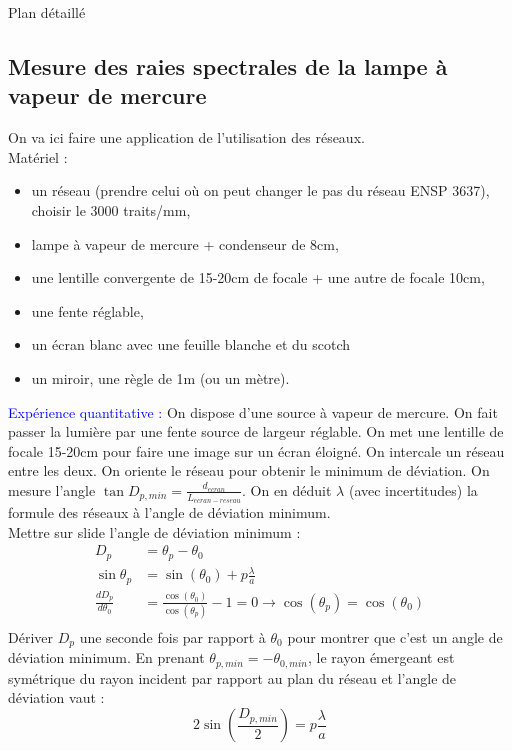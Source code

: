 \begin{reportBlock}{Plan détaillé}
  \subsection{Mesure des raies spectrales de la lampe à vapeur de mercure}
  On va ici faire une application de l'utilisation des réseaux.\\
  Matériel :
  \begin{itemize}
      \item un réseau (prendre celui où on peut changer le pas du réseau ENSP 3637), choisir le 3000 traits/mm,
      \item lampe à vapeur de mercure + condenseur de 8cm,
      \item une lentille convergente de 15-20cm de focale + une autre de focale 10cm,
      \item une fente réglable,
      \item un écran blanc avec une feuille blanche et du scotch
      \item un miroir, une règle de 1m (ou un mètre).
  \end{itemize}
  \textcolor{blue}{Expérience quantitative :} On dispose d'une source à vapeur de mercure. On fait passer la lumière par une fente source de largeur réglable. On met une lentille de focale 15-20cm pour faire une image sur un écran éloigné. On intercale un réseau entre les deux. On oriente le réseau pour obtenir le minimum de déviation. On mesure l'angle $\tan{D_{p,min}}=\frac{d_{ecran}}{L_{ecran-reseau}}$. On en déduit $\lambda$ (avec incertitudes) la formule des réseaux à l'angle de déviation minimum.\\
  
  Mettre sur slide l'angle de déviation minimum :
  \begin{align*}
      D_p &= \theta_p - \theta_0 \\
      \sin{\theta_p} &= \sin(\theta_0) + p\frac{\lambda}{a} \\
      \frac{dD_p}{d\theta_0} &= \frac{\cos(\theta_0)}{\cos(\theta_p)}-1 =0 \rightarrow \cos(\theta_p)=\cos(\theta_0) \\
  \end{align*}
  Dériver $D_p$ une seconde fois par rapport à $\theta_0$ pour montrer que c'est un angle de déviation minimum. En prenant $\theta_{p,min}=-\theta_{0,min}$, le rayon émergeant est symétrique du rayon incident par rapport au plan du réseau et l'angle de déviation vaut :
  \begin{equation}
      2\sin\left(\frac{D_{p,min}}{2}\right) = p\frac{\lambda}{a}
  \end{equation}


\end{reportBlock}
